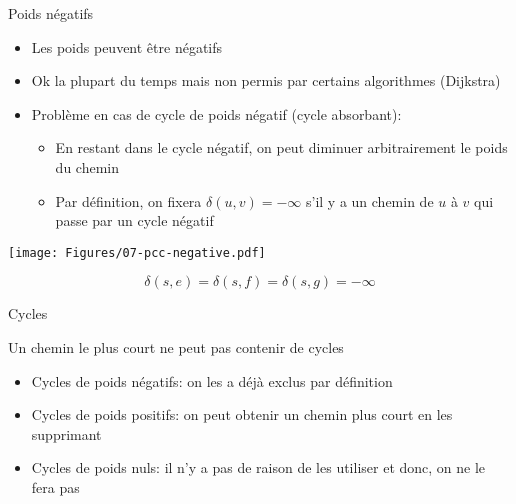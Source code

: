 \begin{frame}{Poids négatifs}

\begin{itemize}
\item Les poids peuvent être négatifs
\item Ok la plupart du temps mais non permis par certains algorithmes (Dijkstra)
\item Problème en cas de cycle de poids négatif (\alert{cycle absorbant}):
\begin{itemize}
\item En restant dans le cycle négatif, on peut diminuer arbitrairement le poids du chemin
\item Par définition, on fixera $\delta(u,v)=-\infty$ s'il y a un chemin de $u$ à $v$ qui passe par un cycle négatif
\end{itemize}
\end{itemize}

\centerline{\texttt{[image: Figures/07-pcc-negative.pdf]}}

$$\delta(s,e)=\delta(s,f)=\delta(s,g)=-\infty$$

\end{frame}

\begin{frame}{Cycles}

Un chemin le plus court ne peut pas contenir de cycles
\begin{itemize}
\item Cycles de poids négatifs: on les a déjà exclus par définition
\item Cycles de poids positifs: on peut obtenir un chemin plus court en les supprimant
\item Cycles de poids nuls: il n'y a pas de raison de les utiliser et donc, on ne le fera pas
\end{itemize}

\end{frame}

